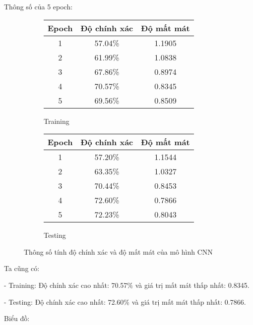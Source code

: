\documentclass[../main.tex]{subfiles}
\begin{document}

Thông số của 5 epoch:

\begin{figure}[h!]
    \centering
    \begin{subfigure}[b]{0.45\textwidth}
        \centering
        \begin{tabular}{|c|c|c|}
            \hline
            \textbf{Epoch} & \textbf{Độ chính xác} & \textbf{Độ mất mát} \\
            \hline
            1 & 57.04\% & 1.1905 \\
            \hline
            2 & 61.99\% & 1.0838 \\
            \hline
            3 & 67.86\% & 0.8974 \\
            \hline
            4 & 70.57\% & 0.8345 \\
            \hline
            5 & 69.56\% & 0.8509 \\
            \hline
        \end{tabular}
        \caption{Training}
    \end{subfigure}
    \hfill
    \begin{subfigure}[b]{0.45\textwidth}
        \centering
        \begin{tabular}{|c|c|c|}
            \hline
            \textbf{Epoch} & \textbf{Độ chính xác} & \textbf{Độ mất mát} \\
            \hline
            1 & 57.20\% & 1.1544 \\
            \hline
            2 & 63.35\% & 1.0327 \\
            \hline
            3 & 70.44\% & 0.8453 \\
            \hline
            4 & 72.60\% & 0.7866 \\
            \hline
            5 & 72.23\% & 0.8043 \\
            \hline
        \end{tabular}
        \caption{Testing}
    \end{subfigure}
    \caption{Thông số tính độ chính xác và độ mất mát của mô hình CNN}
\end{figure}

Ta cũng có: 

- Training: Độ chính xác cao nhất: 70.57\% và giá trị mất mát thấp nhất: 0.8345.

- Testing: Độ chính xác cao nhất: 72.60\% và giá trị mất mát thấp nhất: 0.7866.

Biểu đồ:
\end{document}
